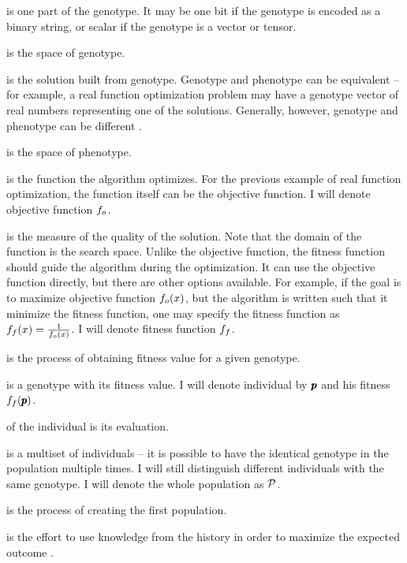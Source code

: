  is one part of the genotype. It may be one bit if the genotype is encoded as a binary string, or scalar if the genotype is a vector or tensor. 

 is the space of genotype.

 is the solution built from genotype. Genotype and phenotype can be equivalent -- for example, a real function optimization problem may have a genotype vector of real numbers representing one of the solutions. Generally, however, genotype and phenotype can be different \citep{GeneticAlgorithmEssentials}.

 is the space of phenotype.

 is the function the algorithm optimizes. For the previous example of real function optimization, the function itself can be the objective function. I will denote objective function $f_o$.

 is the measure of the quality of the solution. Note that the domain of the function is the search space. Unlike the objective function, the fitness function should guide the algorithm during the optimization. It can use the objective function directly, but there are other options available. For example, if the goal is to maximize objective function $f_o(x)$, but the algorithm is written such that it minimize the fitness function, one may specify the fitness function as $f_f(x)=\frac{1}{f_o(x)}$. I will denote fitness function $f_f$.

 is the process of obtaining fitness value for a given genotype.

 is a genotype with its fitness value. I will denote individual by $\pmb{p}$ and his fitness $f_f(\pmb{p})$.

 of the individual is its evaluation. 

 is a multiset of individuals -- it is possible to have the identical genotype in the population multiple times. I will still distinguish different individuals with the same genotype. I will denote the whole population as $\mathcal{P}$.

 is the process of creating the first population.

 is the effort to use knowledge from the history in order to maximize the expected outcome \citep{SelfAdaptiveFeaturesInRealParameterEvolutionaryAlgorithms}.

